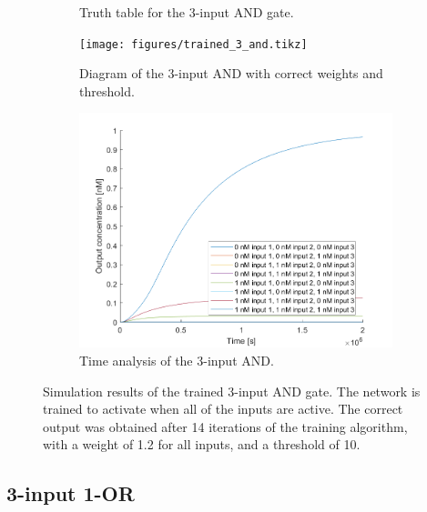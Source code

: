 \begin{figure}[H]
\begin{subfigure}[t]{.49\columnwidth}
\begin{adjustbox}{width=\textwidth}
\begin{tabular}[b]{cccc}
    \hline
    \end{tabular}
  \end{adjustbox}
    \caption{Truth table for the 3-input AND gate.}
    \label{and_table}
\end{subfigure}
\begin{subfigure}[t]{.49\textwidth}
  \texttt{[image: figures/trained\_3\_and.tikz]}
  \caption{Diagram of the 3-input AND with correct weights and threshold.}
\end{subfigure}
\hfill
\begin{subfigure}[t]{\textwidth}
  \centering
\includegraphics[width=\textwidth]{images/and_simulation_3input.png}
\caption{Time analysis of the 3-input AND.}
\label{}
\end{subfigure}
\caption{Simulation results of the trained 3-input AND gate. The network is trained to activate when all of the inputs are active. The correct output was obtained after 14 iterations of the training algorithm, with a weight of 1.2 for all inputs, and a threshold of 10.}
\end{figure}

\subsection{3-input 1-OR}

